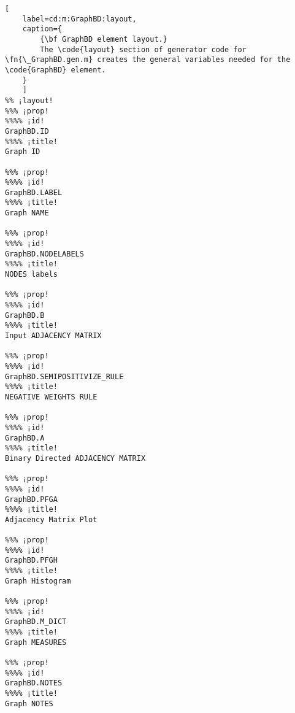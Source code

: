 \documentclass{tufte-handout}
\begin{document}
\begin{lstlisting}[
	label=cd:m:GraphBD:layout,
	caption={
		{\bf GraphBD element layout.}
		The \code{layout} section of generator code for \fn{\_GraphBD.gen.m} creates the general variables needed for the \code{GraphBD} element.
	}
	]
%% ¡layout!
%%% ¡prop!
%%%% ¡id!
GraphBD.ID
%%%% ¡title!
Graph ID

%%% ¡prop!
%%%% ¡id!
GraphBD.LABEL
%%%% ¡title!
Graph NAME

%%% ¡prop!
%%%% ¡id!
GraphBD.NODELABELS
%%%% ¡title!
NODES labels

%%% ¡prop!
%%%% ¡id!
GraphBD.B
%%%% ¡title!
Input ADJACENCY MATRIX

%%% ¡prop!
%%%% ¡id!
GraphBD.SEMIPOSITIVIZE_RULE
%%%% ¡title!
NEGATIVE WEIGHTS RULE

%%% ¡prop!
%%%% ¡id!
GraphBD.A
%%%% ¡title!
Binary Directed ADJACENCY MATRIX

%%% ¡prop!
%%%% ¡id!
GraphBD.PFGA
%%%% ¡title!
Adjacency Matrix Plot

%%% ¡prop!
%%%% ¡id!
GraphBD.PFGH
%%%% ¡title!
Graph Histogram

%%% ¡prop!
%%%% ¡id!
GraphBD.M_DICT
%%%% ¡title!
Graph MEASURES

%%% ¡prop!
%%%% ¡id!
GraphBD.NOTES
%%%% ¡title!
Graph NOTES
\end{lstlisting}
\end{document}
